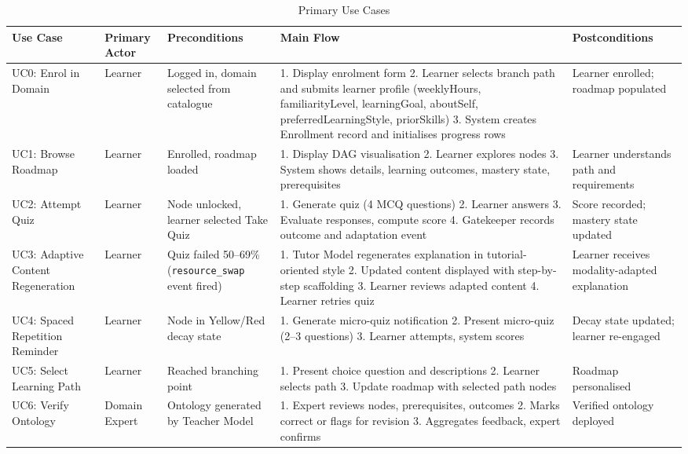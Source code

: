 \begin{table}[htbp]
    \centering
    \caption{Primary Use Cases}
    \label{tab:ch03_usecases}
    \small
    \begin{tabular}{@{}p{2cm}p{1.8cm}p{2.5cm}p{5.5cm}p{2.7cm}@{}}
        \toprule
        \textbf{Use Case} & \textbf{Primary Actor} & \textbf{Preconditions} & \textbf{Main Flow} & \textbf{Postconditions} \\
        \midrule
        UC0: Enrol in Domain & Learner & Logged in, domain selected from catalogue & 1. Display enrolment form 2. Learner selects branch path and submits learner profile (weeklyHours, familiarityLevel, learningGoal, aboutSelf, preferredLearningStyle, priorSkills) 3. System creates Enrollment record and initialises progress rows & Learner enrolled; roadmap populated \\
        UC1: Browse Roadmap & Learner & Enrolled, roadmap loaded & 1. Display DAG visualisation 2. Learner explores nodes 3. System shows details, learning outcomes, mastery state, prerequisites & Learner understands path and requirements \\
        UC2: Attempt Quiz & Learner & Node unlocked, learner selected Take Quiz & 1. Generate quiz (4 MCQ questions) 2. Learner answers 3. Evaluate responses, compute score 4. Gatekeeper records outcome and adaptation event & Score recorded; mastery state updated \\
        UC3: Adaptive Content Regeneration & Learner & Quiz failed 50--69\% (\texttt{resource\_swap} event fired) & 1. Tutor Model regenerates explanation in tutorial-oriented style 2. Updated content displayed with step-by-step scaffolding 3. Learner reviews adapted content 4. Learner retries quiz & Learner receives modality-adapted explanation \\
        UC4: Spaced Repetition Reminder & Learner & Node in Yellow/Red decay state & 1. Generate micro-quiz notification 2. Present micro-quiz (2--3 questions) 3. Learner attempts, system scores & Decay state updated; learner re-engaged \\
        UC5: Select Learning Path & Learner & Reached branching point & 1. Present choice question and descriptions 2. Learner selects path 3. Update roadmap with selected path nodes & Roadmap personalised \\
        UC6: Verify Ontology & Domain Expert & Ontology generated by Teacher Model & 1. Expert reviews nodes, prerequisites, outcomes 2. Marks correct or flags for revision 3. Aggregates feedback, expert confirms & Verified ontology deployed \\

\end{tabular}
\end{table}
